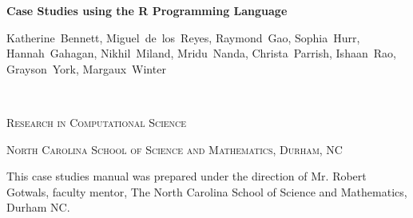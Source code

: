 \documentclass[11pt]{book} %
\begin{document}

\begingroup
\thispagestyle{empty}
\centering
\vspace*{5cm}
\par\normalfont\fontsize{35}{35}\sffamily\selectfont
\textbf{Case Studies using the R Programming Language}\\
{\LARGE }\par %
\vspace*{1cm}
{\Large Katherine~Bennett, Miguel~de~los~Reyes, Raymond~Gao, Sophia~Hurr, Hannah~Gahagan, Nikhil~Miland, Mridu~Nanda, Christa~Parrish, Ishaan~Rao, Grayson~York, Margaux~Winter}\par %
\endgroup


\newpage
~\vfill
\thispagestyle{empty}

\noindent \textsc{Research in Computational Science}\medskip

\noindent \textsc{North Carolina School of Science and Mathematics, Durham, NC}\medskip %

\noindent This case studies manual was prepared under the direction of Mr. Robert Gotwals, faculty mentor, The North Carolina School of Science and Mathematics, Durham NC.\medskip   %
\end{document}
